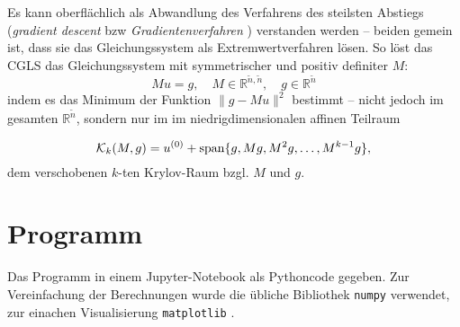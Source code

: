 Es kann oberflächlich als Abwandlung des Verfahrens des steilsten Abstiegs (\textit{gradient descent} bzw \textit{Gradientenverfahren} ) verstanden werden -- beiden gemein ist, dass sie das Gleichungssystem als Extremwertverfahren lösen.
So löst das CGLS das Gleichungssystem mit symmetrischer und positiv definiter $M$:
\begin{equation}
Mu=g, \quad M \in \mathbb{R}^{\tilde{n},\tilde{n}}, \quad g \in \mathbb{R}^{\tilde{n}}
\end{equation}
indem es das Minimum der Funktion $ \| g - Mu \|^2 $ bestimmt -- nicht jedoch im gesamten $ \mathbb{R}^{\tilde{n}} $, sondern nur im im niedrigdimensionalen affinen Teilraum

\begin{equation}
\mathcal{K}_k(M,g)= u^{(0)}+ \operatorname{span} \{g,Mg,M^2g,\dots,M^{k-1}g \},
\end{equation}
dem verschobenen $k$-ten Krylov-Raum bzgl. $M$ und $g$.


\chapter{Programm}
Das Programm in einem Jupyter-Notebook als Pythoncode gegeben. Zur Vereinfachung der Berechnungen wurde die übliche Bibliothek \texttt{numpy} \cite{NumPy} verwendet, zur einachen Visualisierung \texttt{matplotlib} \cite{Matplotlib}.




